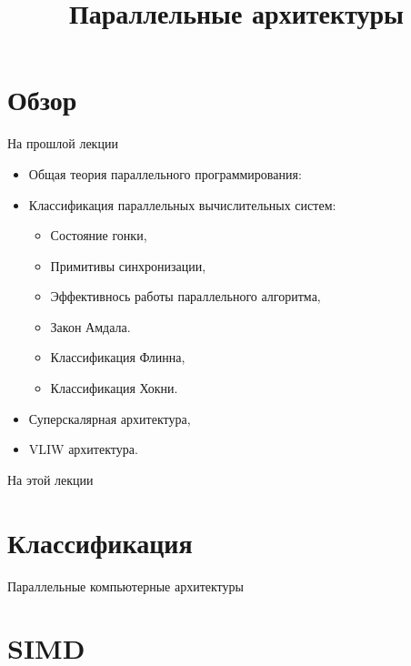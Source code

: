 

\title{Параллельные архитектуры}



\begin{frame}
\titlepage
\end{frame}

\section*{Обзор}

\begin{frame}{На прошлой лекции}
\begin{itemize}
\ifmipt
    \item Общая теория параллельного программирования:
\fi
\ifsbertech
    \item Классификация параллельных вычислительных систем:
\fi
    \begin{itemize}
\ifmipt
        \item Состояние гонки,
        \item Примитивы синхронизации,
        \item Эффективнось работы параллельного алгоритма,
        \item Закон Амдала.
\fi
\ifsbertech
        \item Классификация Флинна,
        \item Классификация Хокни.
\fi
    \end{itemize}
\ifsbertech
    \item Суперскалярная архитектура,
    \item VLIW архитектура.
\fi
\end{itemize}
\end{frame}

\begin{frame}{На этой лекции}
\tableofcontents
\end{frame}

\section{Классификация}

\begin{frame}{Параллельные компьютерные архитектуры}
\centering
{}
\end{frame}

\section{SIMD}

